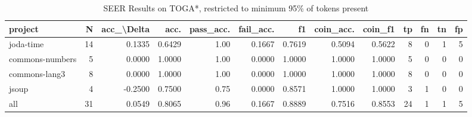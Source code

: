 \begin{table}
\centering
\caption{SEER Results on TOGA*, restricted to minimum 95\% of tokens present}
\label{tab:toga_results_05}
\begin{tabular}{lrrrrrrrrrrrr}
\toprule
         project &   N &  acc\_\textbackslash Delta &    acc. &  pass\_acc. &  fail\_acc. &      f1 &  coin\_acc. &  coin\_f1 &  tp &  fn &  tn &  fp \\
\midrule
       joda-time &  14 &      0.1335 &  0.6429 &       1.00 &     0.1667 &  0.7619 &     0.5094 &   0.5622 &   8 &   0 &   1 &   5 \\
 commons-numbers &   5 &      0.0000 &  1.0000 &       1.00 &     0.0000 &  1.0000 &     1.0000 &   1.0000 &   5 &   0 &   0 &   0 \\
   commons-lang3 &   8 &      0.0000 &  1.0000 &       1.00 &     0.0000 &  1.0000 &     1.0000 &   1.0000 &   8 &   0 &   0 &   0 \\
           jsoup &   4 &     -0.2500 &  0.7500 &       0.75 &     0.0000 &  0.8571 &     1.0000 &   1.0000 &   3 &   1 &   0 &   0 \\
             all &  31 &      0.0549 &  0.8065 &       0.96 &     0.1667 &  0.8889 &     0.7516 &   0.8553 &  24 &   1 &   1 &   5 \\
\bottomrule
\end{tabular}
\end{table}
